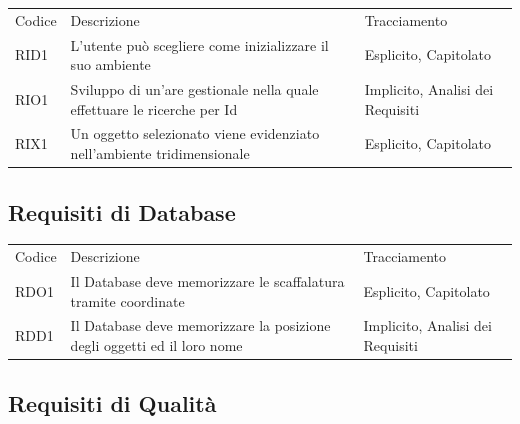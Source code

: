 \begin{table}[h]
\centering
{}
\begin{tabular}{ |>{\centering\arraybackslash}p{1cm}|>{\centering\arraybackslash}p{9cm}|>{\centering\arraybackslash}p{5cm}| }
\hline
\multicolumn{3}{|c|}{\Large Requisiti di Interfaccia} \\
\hline
Codice & Descrizione & Tracciamento\\
\hline
RID1 & L'utente può scegliere come inizializzare il suo ambiente & Esplicito, Capitolato\\
RIO1 & Sviluppo di un'are gestionale nella quale effettuare le ricerche per Id & Implicito, Analisi dei Requisiti\\
RIX1 & Un oggetto selezionato viene evidenziato nell'ambiente tridimensionale & Esplicito, Capitolato\\
\hline
\end{tabular}
\end{table}

\newpage

\subsection{Requisiti di Database}

\setlength{\arrayrulewidth}{0.5mm}
\renewcommand{\arraystretch}{2.5}

\begin{table}[h]
\centering
{}
\begin{tabular}{ |>{\centering\arraybackslash}p{1cm}|>{\centering\arraybackslash}p{9cm}|>{\centering\arraybackslash}p{5cm}| }
\hline
\multicolumn{3}{|c|}{\Large Requisiti di Database} \\
\hline
Codice & Descrizione & Tracciamento\\
\hline
RDO1 & Il Database deve memorizzare le scaffalatura tramite coordinate&Esplicito, Capitolato\\
RDD1 & Il Database deve memorizzare la posizione degli oggetti ed il loro nome & Implicito, Analisi dei Requisiti\\
\hline
\end{tabular}
\end{table}
\newpage

\subsection{Requisiti di Qualità}

